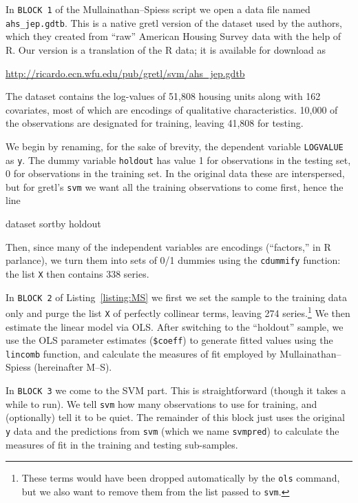 \documentclass{article}
\begin{document}
In \texttt{BLOCK 1} of the Mullainathan--Spiess script we open a data
file named \texttt{ahs\_jep.gdtb}. This is a native gretl version of
the dataset used by the authors, which they created from ``raw''
American Housing Survey data with the help of \textsf{R}. Our version
is a translation of the \textsf{R} data; it is available for download
as

\url{http://ricardo.ecn.wfu.edu/pub/gretl/svm/ahs_jep.gdtb}

The dataset contains the log-values of 51,808 housing units along with
162 covariates, most of which are encodings of qualitative
characteristics. 10,000 of the observations are designated for training,
leaving 41,808 for testing.

We begin by renaming, for the sake of brevity, the dependent variable
\texttt{LOGVALUE} as \texttt{y}. The dummy variable \texttt{holdout}
has value 1 for observations in the testing set, 0 for observations in
the training set. In the original data these are interspersed, but for
gretl's \texttt{svm} we want all the training observations to come
first, hence the line
\begin{code}
dataset sortby holdout
\end{code}
Then, since many of the independent variables are encodings
(``factors,'' in \textsf{R} parlance), we turn them into sets of 0/1
dummies using the \texttt{cdummify} function: the list \texttt{X} then
contains 338 series.

In \texttt{BLOCK 2} of Listing~\ref{listing:MS} we first we set the
sample to the training data only and purge the list \texttt{X} of
perfectly collinear terms, leaving 274 series.\footnote{These terms
  would have been dropped automatically by the \texttt{ols} command,
  but we also want to remove them from the list passed to
  \texttt{svm}.}  We then estimate the linear model via OLS. After
switching to the ``holdout'' sample, we use the OLS parameter
estimates (\texttt{\$coeff}) to generate fitted values using the
\texttt{lincomb} function, and calculate the measures of fit employed
by Mullainathan--Spiess (hereinafter M--S).

In \texttt{BLOCK 3} we come to the SVM part. This is straightforward
(though it takes a while to run). We tell \texttt{svm} how many
observations to use for training, and (optionally) tell it to be
quiet. The remainder of this block just uses the original \texttt{y}
data and the predictions from \texttt{svm} (which we name
\texttt{svmpred}) to calculate the measures of fit in the training and
testing sub-samples.
\end{document}
